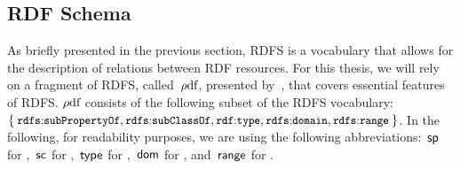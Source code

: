\subsection{RDF Schema}
\label{sec:rdf-schema}

As briefly presented in the previous section, \ac{RDFS} is a vocabulary that allows for the description of relations
between \ac{RDF} resources.
%
For this thesis, we will rely on a fragment of \ac{RDFS}, called~$\mbox{$\rho$df}$, presented
by~\citet{MunozPerezGutierrez:2007aa}, that covers essential features of \ac{RDFS}.
%
$\mbox{$\rho$df}$ consists of the following subset of the \ac{RDFS} vocabulary:~$\left\{\: \mbox{\small$\mathtt{rdfs{:}subPropertyOf}$},
  \mbox{\small$\mathtt{rdfs{:}subClassOf}$}, \mbox{\small$\mathtt{rdf{:}type}$}, \mbox{\small$\mathtt{rdfs{:}domain}$}, \mbox{\small$\mathtt{rdfs{:}range}$}\:\right\}$.  In the following, for
readability purposes, we are using the following abbreviations:~$\mathsf{sp}$ for ,~$\mathsf{sc}$ for
,~$\mathsf{type}$ for ,~$\mathsf{dom}$ for , and~$\mathsf{range}$ for
.



